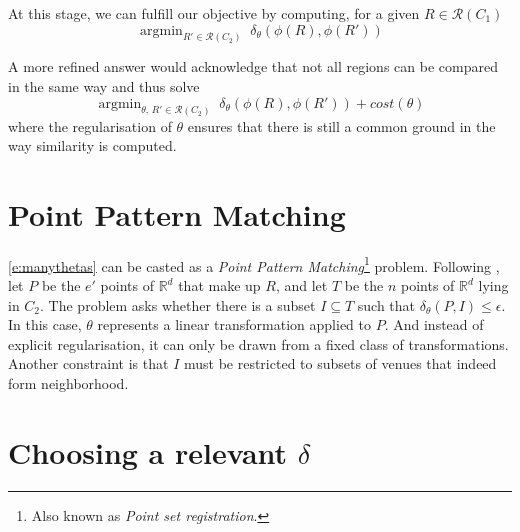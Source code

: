 \documentclass[a4paper,11pt,draft]{scrartcl}
\DeclareMathOperator*{\argmin}{argmin}
\newcommand{\textcite}[1]{}
\begin{document}
\medskip

At this stage, we can fulfill our objective by computing, for a given $R \in
\mathcal{R}(C_1)$
\begin{equation}
    \argmin_{R' \in \mathcal{R}(C_2)}\; \delta_{\theta}
    \left(\phi(R), \phi(R')\right)
    \label{e:onetheta}
\end{equation}

A more refined answer would acknowledge that not all regions can be compared in
the same way and thus solve
\begin{equation}
    \argmin_{\theta ,\, R' \in \mathcal{R}(C_2)}\; \delta_{\theta}
    \left(\phi(R), \phi(R')\right) + cost(\theta)
    \label{e:manythetas}
\end{equation}
where the regularisation of $\theta$ ensures that there is still a common
ground in the way similarity is computed.

\section*{Point Pattern Matching}

\eqref{e:manythetas} can be casted as a \emph{Point Pattern
Matching}\footnote{Also known as \emph{Point set registration}.} problem.
Following \textcite{PointPatternMatching08}, let $P$ be the $e'$ points of
$\mathbb{R}^d$ that make up $R$, and let $T$ be the $n$ points of
$\mathbb{R}^d$ lying in $C_2$. The problem asks whether there is a subset $I
\subseteq T$ such that $\delta_{\theta}\left(P, I\right) \leq \epsilon$. In
this case, $\theta$ represents a linear transformation applied to $P$. And
instead of explicit regularisation, it can only be drawn from a fixed class of
transformations. Another constraint is that $I$ must be restricted to subsets
of venues that indeed form neighborhood.

\section*{Choosing a relevant $\delta$}
\end{document}
